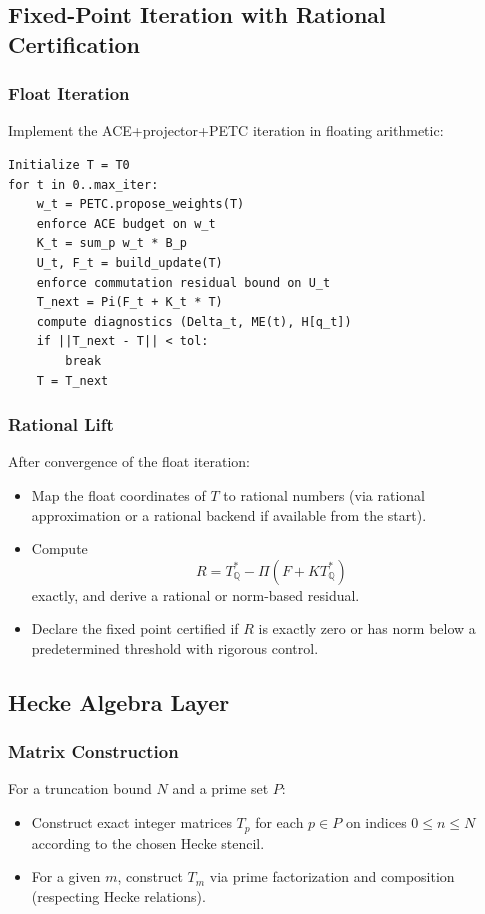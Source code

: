 \documentclass[11pt]{article}
\theoremstyle{definition}
\theoremstyle{plain}
\theoremstyle{remark}
\newcommand{\Qbb}{\mathbb{Q}}
\begin{document}
\subsection{Fixed-Point Iteration with Rational Certification}

\subsubsection*{Float Iteration}

Implement the ACE+projector+PETC iteration in floating arithmetic:

\begin{verbatim}
Initialize T = T0
for t in 0..max_iter:
    w_t = PETC.propose_weights(T)
    enforce ACE budget on w_t
    K_t = sum_p w_t * B_p
    U_t, F_t = build_update(T)
    enforce commutation residual bound on U_t
    T_next = Pi(F_t + K_t * T)
    compute diagnostics (Delta_t, ME(t), H[q_t])
    if ||T_next - T|| < tol:
        break
    T = T_next
\end{verbatim}

\subsubsection*{Rational Lift}

After convergence of the float iteration:

\begin{itemize}[leftmargin=1.5em]
  \item Map the float coordinates of $T$ to rational numbers (via rational approximation or a rational backend if available from the start).
  \item Compute
  \[
    R = T^*_{\Qbb} - \Pi(F + K T^*_{\Qbb})
  \]
  exactly, and derive a rational or norm-based residual.
  \item Declare the fixed point certified if $R$ is exactly zero or has norm below a predetermined threshold with rigorous control.
\end{itemize}

\subsection{Hecke Algebra Layer}

\subsubsection*{Matrix Construction}

For a truncation bound $N$ and a prime set $P$:
\begin{itemize}[leftmargin=1.5em]
  \item Construct exact integer matrices $T_p$ for each $p \in P$ on indices $0 \le n \le N$ according to the chosen Hecke stencil.
  \item For a given $m$, construct $T_m$ via prime factorization and composition (respecting Hecke relations).
\end{itemize}
\end{document}
